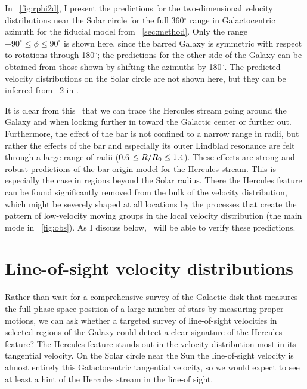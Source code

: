 In \figurename~\ref{fig:rphi2d}, I present the predictions for the
two-dimensional velocity distributions near the Solar circle for the
full 360$^{\circ}$ range in Galactocentric azimuth for the fiducial
model from \sectionname~\ref{sec:method}. Only the range $-90^{\circ}
\leq \phi \leq 90^{\circ}$ is shown here, since the barred Galaxy is
symmetric with respect to rotations through 180$^{\circ}$; the
predictions for the other side of the Galaxy can be obtained from
those shown by shifting the azimuths by 180$^{\circ}$. The predicted
velocity distributions on the Solar circle are not shown here, but
they can be inferred from \figurename~2 in \citet{dehnen00a}.

It is clear from this \figurename\ that we can trace the Hercules
stream going around the Galaxy and when looking further in toward the
Galactic center or further out. Furthermore, the effect of the bar is
not confined to a narrow range in radii, but rather the effects of the
bar and especially its outer Lindblad resonance are felt through a
large range of radii (0.6 $\leq R/R_0 \leq 1.4$). These effects are
strong and robust predictions of the bar-origin model for the Hercules
stream. This is especially the case in regions beyond the Solar
radius. There the Hercules feature can be found significantly removed
from the bulk of the velocity distribution, which might be severely
shaped at all locations by the processes that create the pattern of
low-velocity moving groups in the local velocity distribution (the
main mode in \figurename~\ref{fig:obs}). As I discuss below, \Gaia\
will be able to verify these predictions.




\section{Line-of-sight velocity distributions}

Rather than wait for a comprehensive survey of the Galactic disk that
measures the full phase-space position of a large number of stars by
measuring proper motions, we can ask whether a targeted survey of
line-of-sight velocities in selected regions of the Galaxy could
detect a clear signature of the Hercules feature? The Hercules feature
stands out in the velocity distribution most in its tangential
velocity. On the Solar circle near the Sun the line-of-sight velocity
is almost entirely this Galactocentric tangential velocity, so we
would expect to see at least a hint of the Hercules stream in the
line-of sight.


